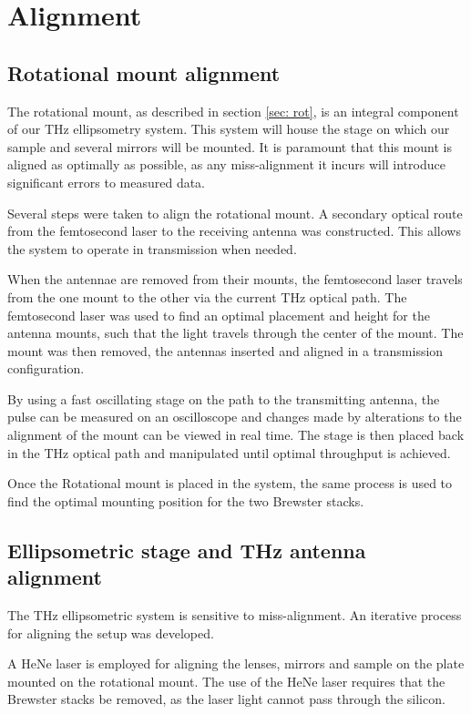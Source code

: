 \chapter{Alignment}
\label{chp:Align}

\section{Rotational mount alignment}
\label{RotAlign}

The rotational mount, as described in section \ref{sec: rot}, is an integral component of our THz ellipsometry system. This system will house the stage on which our sample and several mirrors will be mounted. It is paramount that this mount is aligned as optimally as possible, as any miss-alignment it incurs will introduce significant errors to measured data.

Several steps were taken to align the rotational mount. A secondary optical route from the femtosecond laser to the receiving antenna was constructed. This allows the system to operate in transmission when needed. %

When the antennae are removed from their mounts, the femtosecond laser travels from the one mount to the other via the current THz optical path. The femtosecond laser was used to find an optimal placement and height for the antenna mounts, such that the light travels through the center of the mount. The mount was then removed, the antennas inserted and aligned in a transmission configuration.

By using a fast oscillating stage on the path to the transmitting antenna, the pulse can be measured on an oscilloscope and changes made by alterations to the alignment of the mount can be viewed in real time. The stage is then placed back in the THz optical path and manipulated until optimal throughput is achieved.

Once the Rotational mount is placed in the system, the same process is used to find the optimal mounting position for the two Brewster stacks.

\section{Ellipsometric stage and THz antenna alignment}
\label{chp:EllipsAlign}
The THz ellipsometric system is sensitive to miss-alignment. An iterative process for aligning the setup was developed. 

A HeNe laser is employed for aligning the lenses, mirrors and sample on the plate mounted on the rotational mount. The use of the HeNe laser requires that the Brewster stacks be removed, as the laser light cannot pass through the silicon.

